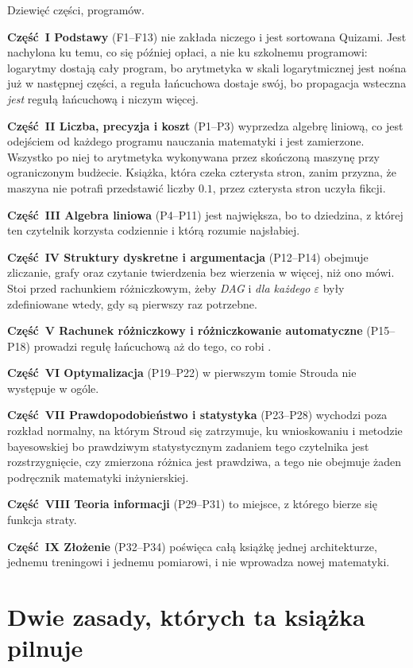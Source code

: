 Dziewięć części,  programów.

\textbf{Część~I \dash{} Podstawy} (F1--F13) nie zakłada niczego i jest sortowana
Quizami. Jest nachylona ku temu, co się później opłaci, a nie ku szkolnemu
programowi: logarytmy dostają cały program, bo arytmetyka w skali
logarytmicznej jest nośna już w następnej części, a reguła łańcuchowa dostaje
swój, bo propagacja wsteczna \emph{jest} regułą łańcuchową i niczym więcej.

\textbf{Część~II \dash{} Liczba, precyzja i koszt} (P1--P3) wyprzedza algebrę
liniową, co jest odejściem od każdego programu nauczania matematyki i jest
zamierzone. Wszystko po niej to arytmetyka wykonywana przez skończoną maszynę
przy ograniczonym budżecie. Książka, która czeka czterysta stron, zanim
przyzna, że maszyna nie potrafi przedstawić liczby $\num{0.1}$, przez czterysta
stron uczyła fikcji.

\textbf{Część~III \dash{} Algebra liniowa} (P4--P11) jest największa, bo to
dziedzina, z której ten czytelnik korzysta codziennie i którą rozumie
najsłabiej.

\textbf{Część~IV \dash{} Struktury dyskretne i argumentacja} (P12--P14) obejmuje
zliczanie, grafy oraz czytanie twierdzenia bez wierzenia w więcej, niż ono
mówi. Stoi przed rachunkiem różniczkowym, żeby \emph{DAG} i \emph{dla każdego
$\varepsilon$} były zdefiniowane wtedy, gdy są pierwszy raz potrzebne.

\textbf{Część~V \dash{} Rachunek różniczkowy i różniczkowanie automatyczne}
(P15--P18) prowadzi regułę łańcuchową aż do tego, co robi .

\textbf{Część~VI \dash{} Optymalizacja} (P19--P22) w pierwszym tomie Strouda nie
występuje w ogóle.

\textbf{Część~VII \dash{} Prawdopodobieństwo i statystyka} (P23--P28) wychodzi poza
rozkład normalny, na którym Stroud się zatrzymuje, ku wnioskowaniu i metodzie
bayesowskiej \dash{} bo prawdziwym statystycznym zadaniem tego czytelnika jest
rozstrzygnięcie, czy zmierzona różnica jest prawdziwa, a tego nie obejmuje
żaden podręcznik matematyki inżynierskiej.

\textbf{Część~VIII \dash{} Teoria informacji} (P29--P31) to miejsce, z którego
bierze się funkcja straty.

\textbf{Część~IX \dash{} Złożenie} (P32--P34) poświęca całą książkę jednej
architekturze, jednemu treningowi i jednemu pomiarowi, i nie wprowadza nowej
matematyki.

\section*{Dwie zasady, których ta książka pilnuje}

